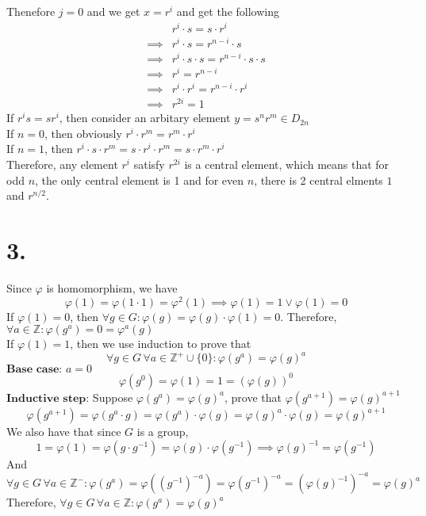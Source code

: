 \documentclass[11pt]{article}
\begin{document}
Thenefore $j=0$ and we get $x = r^i$ and get the following
\begin{equation*}
\begin{aligned}
&r^i \cdot s = s \cdot r^i \\
\implies &r^i \cdot s = r^{n-i} \cdot s \\
\implies &r^i \cdot s \cdot s = r^{n-i} \cdot s \cdot s \\
\implies &r^i = r^{n-i} \\
\implies &r^i \cdot r^i = r^{n-i} \cdot r^i \\
\implies &r^{2i} = 1
\end{aligned}
\end{equation*}
If $r^i s = sr^i$, then consider an arbitary element $y =s^n r^m  \in D_{2n}$ \\
If $n=0$, then obviously $r^i\cdot r^m = r^m\cdot r^i$ \\
If $n=1$, then $r^i \cdot s \cdot r^m = s \cdot r^i \cdot r^m = s \cdot r^m \cdot r^i$ \\
Therefore, any element $r^i$ satisfy $r^{2i}$ is a central element, which means that for odd $n$, the only central element is 1 and for even $n$, there is 2 central elments  $1$ and $r^{n/2}$.
\pagebreak
\section*{3.}
Since $\varphi$ is homomorphism, we have 
\[
\varphi(1) = \varphi(1 \cdot 1) = \varphi^2(1) \implies \varphi(1) = 1 \lor \varphi(1) = 0
\]
If $\varphi(1) = 0$, then $\forall g \in G: \varphi(g) = \varphi(g) \cdot \varphi(1) = 0$. 
Therefore, $\forall a \in \mathbb{Z}: \varphi(g^a) = 0 = \varphi^a(g)$ \\
If $\varphi(1) = 1$, then we use induction to prove that 
\[
\forall g \in G \, \forall a \in \mathbb{Z}^+ \cup \{0\} :\varphi(g^a) = \varphi(g)^a
\]
$\textbf{Base case:  }a = 0$ \\
\[
\varphi(g^0) = \varphi(1) = 1 = (\varphi(g))^0
\]
$\textbf{Inductive step:}$ Suppose $\varphi(g^a) = \varphi(g)^a$, prove that $\varphi(g^{a+1}) = \varphi(g)^{a+1}$
\[
\varphi(g^{a+1}) = \varphi(g^a \cdot g) = \varphi(g^a) \cdot \varphi(g) = \varphi(g)^a \cdot \varphi(g) = \varphi(g)^{a+1}
\]
We also have that since $G$ is a group, 
\[
1 =\varphi(1) = \varphi(g \cdot g^{-1}) = \varphi(g) \cdot \varphi(g^{-1}) \implies \varphi(g)^{-1} = \varphi(g^{-1})
\]
And 
\[
\forall g \in G \, \forall a \in \mathbb{Z}^- :\varphi(g^a) = \varphi((g^{-1})^{-a}) = \varphi(g^{-1})^{-a} = (\varphi(g)^{-1})^{-a} = \varphi(g)^a
\]
Therefore, $\forall g \in G \, \forall a \in \mathbb{Z}:\varphi(g^a) = \varphi(g)^a$
\pagebreak
\end{document}
